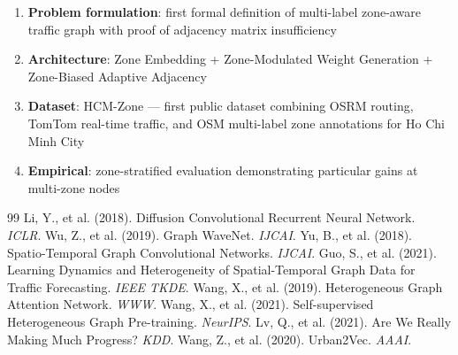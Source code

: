 \documentclass[12pt,a4paper]{article}
\begin{document}
\begin{enumerate}
    \item \textbf{Problem formulation}: first formal definition of multi-label
          zone-aware traffic graph with proof of adjacency matrix insufficiency
    \item \textbf{Architecture}: Zone Embedding + Zone-Modulated Weight Generation
          + Zone-Biased Adaptive Adjacency
    \item \textbf{Dataset}: HCM-Zone — first public dataset combining OSRM routing,
          TomTom real-time traffic, and OSM multi-label zone annotations for
          Ho Chi Minh City
    \item \textbf{Empirical}: zone-stratified evaluation demonstrating particular
          gains at multi-zone nodes
\end{enumerate}

\begin{thebibliography}{99}
 Li, Y., et al. (2018). Diffusion Convolutional Recurrent Neural
Network. \textit{ICLR}.
 Wu, Z., et al. (2019). Graph WaveNet. \textit{IJCAI}.
 Yu, B., et al. (2018). Spatio-Temporal Graph Convolutional Networks.
\textit{IJCAI}.
 Guo, S., et al. (2021). Learning Dynamics and Heterogeneity of
Spatial-Temporal Graph Data for Traffic Forecasting. \textit{IEEE TKDE}.
 Wang, X., et al. (2019). Heterogeneous Graph Attention
Network. \textit{WWW}.
 Wang, X., et al. (2021). Self-supervised Heterogeneous Graph
Pre-training. \textit{NeurIPS}.
 Lv, Q., et al. (2021). Are We Really Making Much Progress? \textit{KDD}.
 Wang, Z., et al. (2020). Urban2Vec. \textit{AAAI}.
\end{thebibliography}
\end{document}
